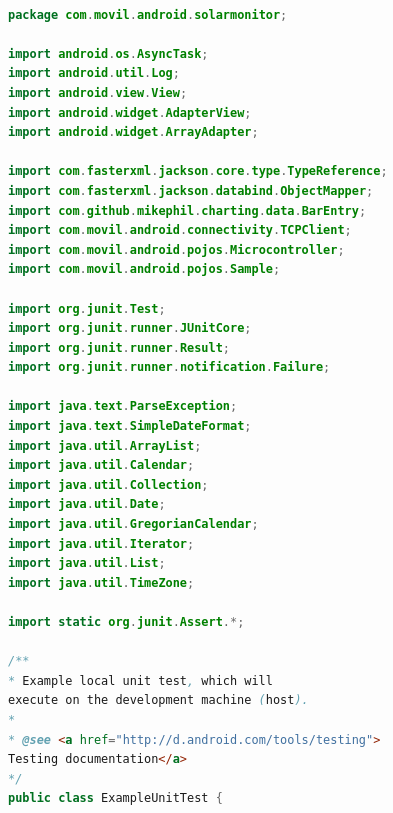 \begin{lstlisting}[language= Java, frame=single]

package com.movil.android.solarmonitor;

import android.os.AsyncTask;
import android.util.Log;
import android.view.View;
import android.widget.AdapterView;
import android.widget.ArrayAdapter;

import com.fasterxml.jackson.core.type.TypeReference;
import com.fasterxml.jackson.databind.ObjectMapper;
import com.github.mikephil.charting.data.BarEntry;
import com.movil.android.connectivity.TCPClient;
import com.movil.android.pojos.Microcontroller;
import com.movil.android.pojos.Sample;

import org.junit.Test;
import org.junit.runner.JUnitCore;
import org.junit.runner.Result;
import org.junit.runner.notification.Failure;

import java.text.ParseException;
import java.text.SimpleDateFormat;
import java.util.ArrayList;
import java.util.Calendar;
import java.util.Collection;
import java.util.Date;
import java.util.GregorianCalendar;
import java.util.Iterator;
import java.util.List;
import java.util.TimeZone;

import static org.junit.Assert.*;

/**
* Example local unit test, which will
execute on the development machine (host).
*
* @see <a href="http://d.android.com/tools/testing">
Testing documentation</a>
*/
public class ExampleUnitTest {


\end{lstlisting}
